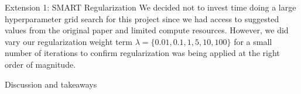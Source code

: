 \documentclass[final]{beamer}
\newlength{\colwidth}
\begin{document}
\begin{frame}[t]
\begin{columns}[t]
\begin{column}{\colwidth}
\begin{block}{Extension 1: SMART Regularization}
We decided not to invest time doing a large hyperparameter grid search for this project since we had access to suggested values from the original paper and limited compute resources. However, we did vary our regularization weight term $\lambda = \{0.01, 0.1, 1, 5, 10, 100\}$ for a small number of iterations to confirm regularization was being applied at the right order of magnitude.



  \end{block}

\begin{alertblock}{\small Discussion and takeaways}


\end{alertblock}
\end{column}
\end{columns}
\end{frame}
\end{document}
